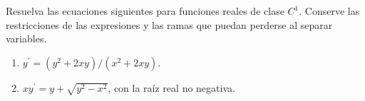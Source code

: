 Resuelva las ecuaciones siguientes para funciones reales de clase $C^1$. Conserve las restricciones de las expresiones y las ramas que puedan perderse al separar variables.

\begin{enumerate}[label=(\alph*),ref=\alph*,leftmargin=*]
\item $y^{\prime}=(y^2+2xy)/(x^2+2xy)$.
\item $xy^{\prime}=y+\sqrt{y^2-x^2}$, con la raíz real no negativa.
\end{enumerate}
